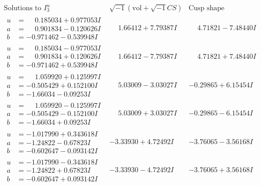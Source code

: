 \documentclass[1p]{elsarticle_modified}
\theoremstyle{definition}
\newcommand{\I}{\sqrt{-1}}
\begin{document}
$$\begin{array}{c|c|c}  
\text{Solutions to }I^u_{3}& \I (\text{vol} + \sqrt{-1}CS) & \text{Cusp shape}\\
 \hline 
\begin{aligned}
u &= \phantom{-}0.185034 + 0.977053 I \\
a &= \phantom{-}0.901834 - 0.120626 I \\
b &= -0.971462 - 0.539948 I\end{aligned}
 & \phantom{-}1.66412 + 7.79387 I & \phantom{-}4.71821 - 7.48440 I \\ \hline\begin{aligned}
u &= \phantom{-}0.185034 - 0.977053 I \\
a &= \phantom{-}0.901834 + 0.120626 I \\
b &= -0.971462 + 0.539948 I\end{aligned}
 & \phantom{-}1.66412 - 7.79387 I & \phantom{-}4.71821 + 7.48440 I \\ \hline\begin{aligned}
u &= \phantom{-}1.059920 + 0.125997 I \\
a &= -0.505429 + 0.152100 I \\
b &= -1.66034 - 0.09253 I\end{aligned}
 & \phantom{-}5.03009 - 3.03027 I & -0.29865 + 6.15454 I \\ \hline\begin{aligned}
u &= \phantom{-}1.059920 - 0.125997 I \\
a &= -0.505429 - 0.152100 I \\
b &= -1.66034 + 0.09253 I\end{aligned}
 & \phantom{-}5.03009 + 3.03027 I & -0.29865 - 6.15454 I \\ \hline\begin{aligned}
u &= -1.017990 + 0.343618 I \\
a &= -1.24822 - 0.67823 I \\
b &= -0.602647 - 0.093142 I\end{aligned}
 & -3.33930 + 4.72492 I & -3.76065 - 3.56168 I \\ \hline\begin{aligned}
u &= -1.017990 - 0.343618 I \\
a &= -1.24822 + 0.67823 I \\
b &= -0.602647 + 0.093142 I\end{aligned}
 & -3.33930 - 4.72492 I & -3.76065 + 3.56168 I \\ \hline\begin{aligned}

\end{aligned}
\end{array}$$
\end{document}
